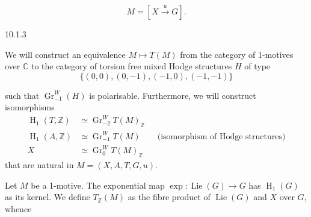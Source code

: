   \[     M = [X\xrightarrow {u}G].   \]\begin{construction}{10.1.3}\label{hodge-theory-iii-10.1.3}\skipsinglepar\par{}We will construct an equivalence \(M\mapsto  T(M)\) from the category of 1-motives over \(\mathbb {C}\) to the category of torsion free mixed Hodge structures \(H\) of type
    \[       \big \{ (0,0), (0,-1), (-1,0), (-1,-1) \big \}     \]
    
    such that \(\operatorname {Gr}_{-1}^W(H)\) is polarisable.
    Furthermore, we will construct isomorphisms
    \[       \begin {aligned}         \operatorname {H}_1(T,\mathbb {Z})         &\simeq  \operatorname {Gr}_{-2}^WT(M)_\mathbb {Z}       \\\operatorname {H}_1(A,\mathbb {Z})         &\simeq  \operatorname {Gr}_{-1}^WT(M)         \qquad \text {(isomorphism of Hodge structures)}       \\X         &\simeq  \operatorname {Gr}_0^WT(M)_\mathbb {Z}       \end {aligned}     \]
    that are natural in \(M=(X,A,T,G,u)\).\par{}Let \(M\) be a 1-motive.
    The exponential map \(\exp \colon \operatorname {Lie}(G)\to  G\) has \(\operatorname {H}_1(G)\) as its kernel.
    We define \(T_\mathbb {Z}(M)\) as the fibre product of \(\operatorname {Lie}(G)\) and \(X\) over \(G\), whence


\end{construction}
